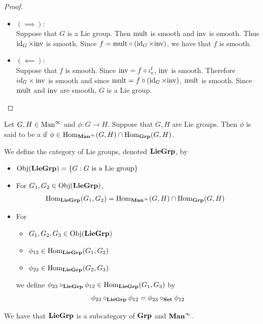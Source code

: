 \documentclass{book}
\begin{document}
\begin{proof}\
	\begin{itemize}
		\item $(\implies)$: \\
		Suppose that $G$ is a Lie group. Then $\mult$ is smooth and $\inv$ is smooth. Thus $\id_G \times \inv$ is smooth. Since $f = \mult \circ (\id_G \times \inv)$, we have that $f$ is smooth. 
		\item $(\impliedby)$: \\
		Suppose that $f$ is smooth. Since $\inv = f \circ \iota^l_e$, $\inv$ is smooth. Therefore $id_G \times \inv$ is smooth and since $\mult = f \circ (\id_G \times \inv)$, $\mult$ is smooth. Since $\mult$ and $\inv$ are smooth, $G$ is a Lie group. 
	\end{itemize}
\end{proof}

\begin{ex}
	Let $G, H \in \Maninf$ and $\phi: G \rightarrow H$. Suppose that $G, H$ are Lie groups. Then $\phi$ is said to be a  if $\phi \in \Hom_{\bManinf}(G, H) \cap \Hom_{\bGrp}(G, H)$.
\end{ex}

\begin{defn}
	We define the category of Lie groups, denoted $\bLieGrp$, by 
	\begin{itemize}
		\item $\Obj(\bLieGrp) = \{G: G \text{ is a Lie group} \}$ 
		\item For $G_1, G_2 \in \Obj(\bLieGrp)$, 
		\begin{align*}
			& \Hom_{\bLieGrp}(G_1, G_2) = \Hom_{\bManinf}(G, H) \cap \Hom_{\bGrp}(G, H)
		\end{align*}
		\item For 
		\begin{itemize}
			\item $G_1, G_2, G_3 \in \Obj(\bLieGrp)$ 
			\item $\phi_{12} \in \Hom_{\bLieGrp}(G_1, G_2)$
			\item $\phi_{23} \in \Hom_{\bLieGrp}(G_2, G_3)$
		\end{itemize}
		we define $ \phi_{23} \circ_{\bLieGrp} \phi_{12} \in \Hom_{\bLieGrp}(G_1, G_3)$ by 
		$$ \phi_{23} \circ_{\bLieGrp} \phi_{12} = \phi_{23} \circ_{\bSet} \phi_{12}$$
	\end{itemize}
\end{defn}

\begin{ex}
	We have that $\bLieGrp$ is a subcategory of $\bGrp$ and $\bManinf$.
\end{ex}
\end{document}
